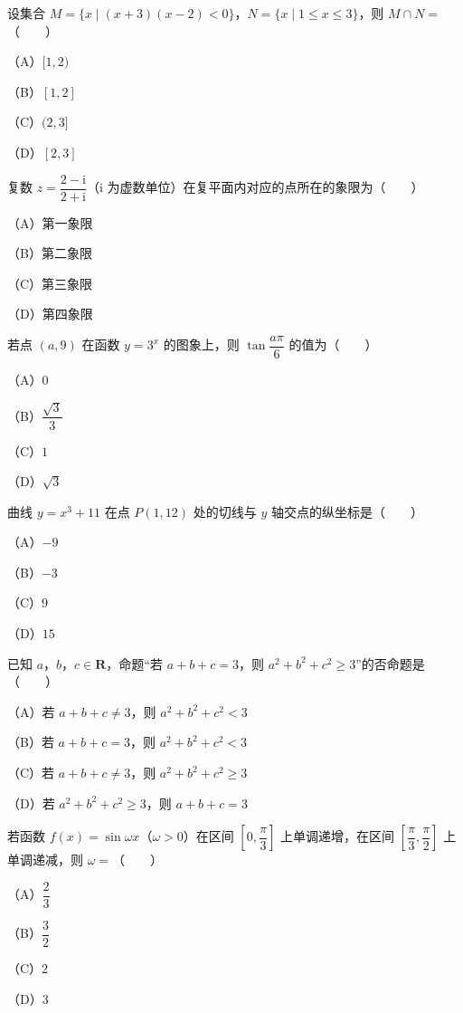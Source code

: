 \begin{question}
设集合 $M=\{x\mid (x+3)(x-2)<0\}$，$N=\{x\mid 1\leqslant x\leqslant 3\}$，则 $M\cap N=$\mbox{（　　）}

（A）$[1,2)$

（B）$[1,2]$

（C）$(2,3]$

（D）$[2,3]$

\end{question}
\begin{question}
复数 $z=\dfrac{2-\mathrm i}{2+\mathrm i}$（$\mathrm i$ 为虚数单位）在复平面内对应的点所在的象限为\mbox{（　　）}

（A）第一象限

（B）第二象限

（C）第三象限

（D）第四象限

\end{question}
\begin{question}
若点 $(a,9)$ 在函数 $y=3^x$ 的图象上，则 $\tan\dfrac{a\pi}{6}$ 的值为\mbox{（　　）}

（A）$0$

（B）$\dfrac{\sqrt3}{3}$

（C）$1$

（D）$\sqrt3$

\end{question}
\begin{question}
曲线 $y=x^3+11$ 在点 $P(1,12)$ 处的切线与 $y$ 轴交点的纵坐标是\mbox{（　　）}

（A）$-9$

（B）$-3$

（C）$9$

（D）$15$

\end{question}
\begin{question}
已知 $a$，$b$，$c\in\mathbf R$，命题“若 $a+b+c=3$，则 $a^2+b^2+c^2\geqslant 3$”的否命题是\mbox{（　　）}

（A）若 $a+b+c\neq 3$，则 $a^2+b^2+c^2<3$

（B）若 $a+b+c=3$，则 $a^2+b^2+c^2<3$

（C）若 $a+b+c\neq 3$，则 $a^2+b^2+c^2\geqslant 3$

（D）若 $a^2+b^2+c^2\geqslant 3$，则 $a+b+c=3$

\end{question}
\begin{question}
若函数 $f(x)=\sin\omega x$（$\omega>0$）在区间 $\left[0,\dfrac{\pi}{3}\right]$ 上单调递增，在区间 $\left[\dfrac{\pi}{3},\dfrac{\pi}{2}\right]$ 上单调递减，则 $\omega=$\mbox{（　　）}

（A）$\dfrac23$

（B）$\dfrac32$

（C）$2$

（D）$3$

\end{question}
